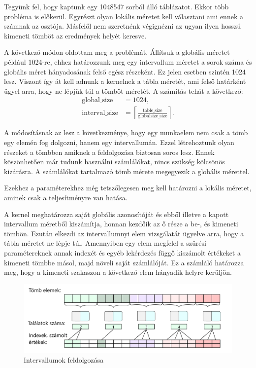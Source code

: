 \newpage


Tegyünk fel, hogy kaptunk egy 1048547 sorból álló táblázatot. Ekkor több probléma is előkerül. Egyrészt olyan lokális méretet kell választani ami ennek a számnak az osztója. Másfelől nem szeretnénk végignézni az ugyan ilyen hosszú kimeneti tömböt az eredmények helyét keresve.

A következő módon oldottam meg a problémát. Állítsuk a globális méretet például 1024-re, ehhez határozzunk meg egy intervallum méretet a sorok száma és globális méret hányadosának felső egész részeként. Ez jelen esetben szintén 1024 lesz. Viszont így át kell adnunk a kernelnek a tábla méretét, ami felső határként ügyel arra, hogy ne lépjük túl a tömböt méretét. A számítás tehát a következő:
\begin{align*}
\text{global\_size} &= 1024, \\
\text{interval\_size} &=
\left\lceil \frac{\text{table\_size}}{\text{globalsize\_size}} \right\rceil.
\end{align*}

A módosításnak az lesz a következménye, hogy egy munkaelem nem csak a tömb egy elemén fog dolgozni, hanem egy intervallumán. Ezzel létrehoztunk olyan részeket a tömbben amiknek a feldolgozása biztosan soros lesz. Ennek köszönhetően már tudunk használni számlálókat, nincs szükség kölcsönös kizárásra. A számlálókat tartalmazó tömb mérete megegyezik a globális mérettel.

Ezekhez a paraméterekhez még tetszőlegesen meg kell határozni a lokális méretet, aminek csak a teljesítményre van hatása.


A kernel meghatározza saját globális azonosítóját és ebből illetve a kapott intervallum méretből kiszámítja, honnan kezdőik az ő része a be-, és kimeneti tömbön. Ezután elkezdi az intervallumnyi elem vizsgálatát ügyelve arra, hogy a tábla méretet ne lépje túl. Amennyiben egy elem megfelel a szűrési paramétereknek annak indexét és egyéb lekérdezés függő kiszámolt értékeket a kimeneti tömbbe másol, majd növeli saját számlálóját. Ez a számláló határozza meg, hogy a kimeneti szakaszon a következő elem hányadik helyre kerüljön.

\begin{figure}[h!]
\centering
\includegraphics[width=\textwidth]{images/itemgroup_black.png}
\caption{Intervallumok feldolgozása}
\label{fig:itemgroup_black}
\end{figure}

